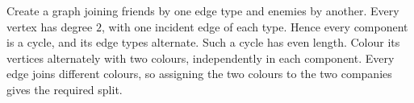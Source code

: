 Create a graph joining friends by one edge type and enemies by another. Every vertex has degree $2$, with one incident edge of each type. Hence every component is a cycle, and its edge types alternate. Such a cycle has even length. Colour its vertices alternately with two colours, independently in each component. Every edge joins different colours, so assigning the two colours to the two companies gives the required split.
